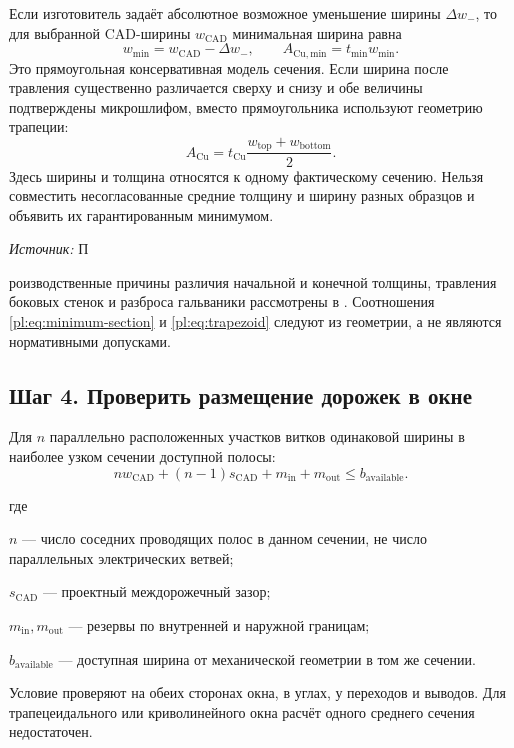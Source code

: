 \documentclass[14pt,a4paper]{extarticle}
\newcommand{\source}[1]{\par\noindent\textit{Источник:} #1\par}
\newenvironment{whereblock}
 {\par\noindent где\par
  \begin{list}{}{\setlength{\leftmargin}{12.5mm}
                  \setlength{\itemindent}{-12.5mm}
                  \setlength{\itemsep}{0pt}
                  \setlength{\parsep}{0pt}
                  \setlength{\topsep}{0pt}}}
 {\end{list}}
\newcommand{\whereitem}[2]{\item[] #1 --- #2}
\begin{document}
Если изготовитель задаёт абсолютное возможное уменьшение ширины $\Delta w_-$, то для выбранной CAD-ширины $w_{\mathrm{CAD}}$ минимальная ширина равна
\begin{equation}
 w_{\min}=w_{\mathrm{CAD}}-\Delta w_-,\qquad
 A_{\mathrm{Cu,min}}=t_{\min}w_{\min}.
 \label{pl:eq:minimum-section}
\end{equation}
Это прямоугольная консервативная модель сечения. Если ширина после травления существенно различается сверху и снизу и обе величины подтверждены микрошлифом, вместо прямоугольника используют геометрию трапеции:
\begin{equation}
 A_{\mathrm{Cu}}=t_{\mathrm{Cu}}\frac{w_{\mathrm{top}}+w_{\mathrm{bottom}}}{2}.
 \label{pl:eq:trapezoid}
\end{equation}
Здесь ширины и толщина относятся к одному фактическому сечению. Нельзя совместить несогласованные средние толщину и ширину разных образцов и объявить их гарантированным минимумом.

\source Производственные причины различия начальной и конечной толщины, травления боковых стенок и разброса гальваники рассмотрены в \cite{web16,web22}. Соотношения \eqref{pl:eq:minimum-section} и \eqref{pl:eq:trapezoid} следуют из геометрии, а не являются нормативными допусками.

\subsection{Шаг 4. Проверить размещение дорожек в окне}
Для $n$ параллельно расположенных участков витков одинаковой ширины в наиболее узком сечении доступной полосы:
\begin{equation}
 n w_{\mathrm{CAD}}+(n-1)s_{\mathrm{CAD}}+m_{\mathrm{in}}+m_{\mathrm{out}}
 \leq b_{\mathrm{available}}.
 \label{pl:eq:radial-fit}
\end{equation}
\begin{whereblock}
\whereitem{$n$}{число соседних проводящих полос в данном сечении, не число параллельных электрических ветвей;}
\whereitem{$s_{\mathrm{CAD}}$}{проектный междорожечный зазор;}
\whereitem{$m_{\mathrm{in}},m_{\mathrm{out}}$}{резервы по внутренней и наружной границам;}
\whereitem{$b_{\mathrm{available}}$}{доступная ширина от механической геометрии в том же сечении.}
\end{whereblock}
Условие проверяют на обеих сторонах окна, в углах, у переходов и выводов. Для трапецеидального или криволинейного окна расчёт одного среднего сечения недостаточен.
\end{document}
